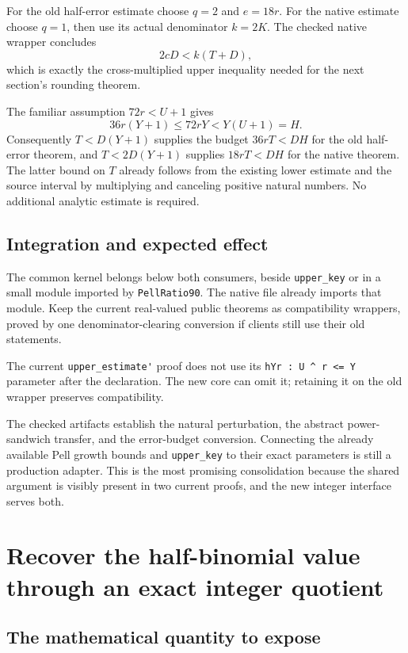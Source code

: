 \documentclass[11pt,a4paper]{article}
\newcommand{\code}[1]{\nolinkurl{#1}}
\begin{document}
For the old half-error estimate choose \(q=2\) and \(e=18r\).
For the native estimate choose \(q=1\), then use its actual denominator
\(k=2K\). The checked native wrapper concludes
\begin{equation}
 2cD<k(T+D),
 \label{eq:native-upper}
\end{equation}
which is exactly the cross-multiplied upper inequality needed for the next
section's rounding theorem.

The familiar assumption \(72r<U+1\) gives
\[
 36r(Y+1)\le72rY<Y(U+1)=H.
\]
Consequently \(T<D(Y+1)\) supplies the budget \(36rT<DH\) for the old
half-error theorem, and \(T<2D(Y+1)\) supplies \(18rT<DH\) for the native
theorem. The latter bound on \(T\) already follows from the existing lower
estimate and the source interval by multiplying and canceling positive
natural numbers. No additional analytic estimate is required.

\subsection{Integration and expected effect}

The common kernel belongs below both consumers, beside \code{upper_key} or
in a small module imported by \code{PellRatio90}. The native file already
imports that module. Keep the current real-valued public theorems as
compatibility wrappers, proved by one denominator-clearing conversion if
clients still use their old statements.

The current \code{upper_estimate'} proof does not use its
\code{hYr : U ^ r <= Y} parameter after the declaration. The new core can omit
it; retaining it on the old wrapper preserves compatibility.

The checked artifacts establish the natural perturbation, the abstract
power-sandwich transfer, and the error-budget conversion. Connecting the
already available Pell growth bounds and \code{upper_key} to their exact
parameters is still a production adapter. This is the most promising
consolidation because the shared argument is visibly present in two current
proofs, and the new integer interface serves both.

\section{Recover the half-binomial value through an exact integer quotient}
\label{sec:rounding}

\subsection{The mathematical quantity to expose}
\end{document}
